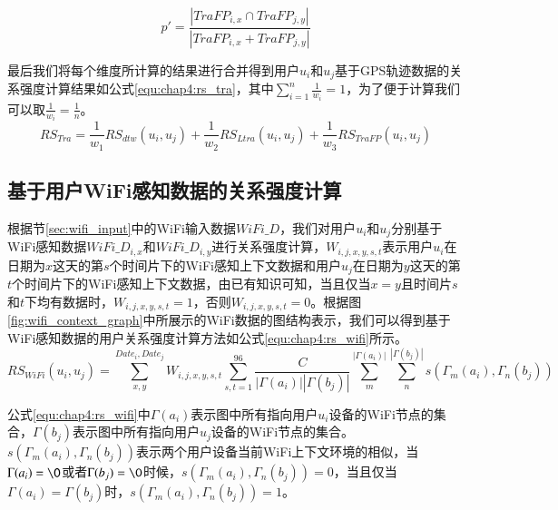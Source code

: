 \begin{equation}
\label{equ:chap4:p}
{p}'=\frac{\left |TraFP_{i,x} \cap TraFP_{j,y}   \right |}{\left |TraFP_{i,x} + TraFP_{j,y}   \right |}
\end{equation}
\par 最后我们将每个维度所计算的结果进行合并得到用户$u_{i}$和$u_{j}$基于GPS轨迹数据的关系强度计算结果如公式\ref{equ:chap4:rs_tra}，其中$ \sum_{i=1}^{n}\frac{1}{w_{i}}=1$，为了便于计算我们可以取$\frac{1}{w_{i}}=\frac{1}{n}$。
\begin{equation}
\label{equ:chap4:rs_tra}
RS_{Tra}=\frac{1}{w_{1}} RS_{dtw}(u_{i},u_{j})+\frac{1}{w_{2}}RS_{Ltra}(u_{i},u_{j})+\frac{1}{w_{3}}RS_{TraFP}(u_{i},u_{j})
\end{equation}
\subsection{基于用户WiFi感知数据的关系强度计算}
根据节\ref{sec:wifi_input}中的WiFi输入数据$WiFi\_D$，我们对用户$u_{i}$和$u_{j}$分别基于WiFi感知数据$WiFi\_D_{i,x}$和$WiFi\_D_{i,y}$进行关系强度计算，$W_{i,j,x,y,s,t}$表示用户$u_{i}$在日期为$x$这天的第$s$个时间片下的WiFi感知上下文数据和用户$u_{j}$在日期为$y$这天的第$t$个时间片下的WiFi感知上下文数据，由已有知识可知，当且仅当$x=y$且时间片$s$和$t$下均有数据时，$W_{i,j,x,y,s,t}=1$，否则$W_{i,j,x,y,s,t}=0$。根据图\ref{fig:wifi_context_graph}中所展示的WiFi数据的图结构表示，我们可以得到基于WiFi感知数据的用户关系强度计算方法如公式\ref{equ:chap4:rs_wifi}所示。
\begin{equation}
\label{equ:chap4:rs_wifi}
RS_{WiFi}(u_{i},u_{j})=\sum_{x ,y }^{ Date_{i}, Date_{j}}W_{i,j,x,y,s,t}\sum_{s,t=1}^{96} \frac{C}{ \left |\Gamma (a_{i})  \right |\left |\Gamma (b_{j})  \right | } \sum_{m}^{\left |\Gamma (a_{i})  \right |}  \sum_{n}^{\left |\Gamma (b_{j})  \right |}s(\Gamma_{m} (a_{i}),\Gamma_{n} (b_{j}))
\end{equation}
\par 公式\ref{equ:chap4:rs_wifi}中$\Gamma (a_{i}) $表示图中所有指向用户$u_{i}$设备的WiFi节点的集合，$\Gamma (b_{j}) $表示图中所有指向用户$u_{j}$设备的WiFi节点的集合。$s(\Gamma_{m} (a_{i}),\Gamma_{n} (b_{j}))$表示两个用户设备当前WiFi上下文环境的相似，当$\Gamma (a_{i})= \O$或者$\Gamma (b_{j})=\O$时候，$s(\Gamma_{m} (a_{i}),\Gamma_{n} (b_{j}))=0$，当且仅当$\Gamma (a_{i})=\Gamma (b_{j})$时，$s(\Gamma_{m} (a_{i}),\Gamma_{n} (b_{j}))=1$。
